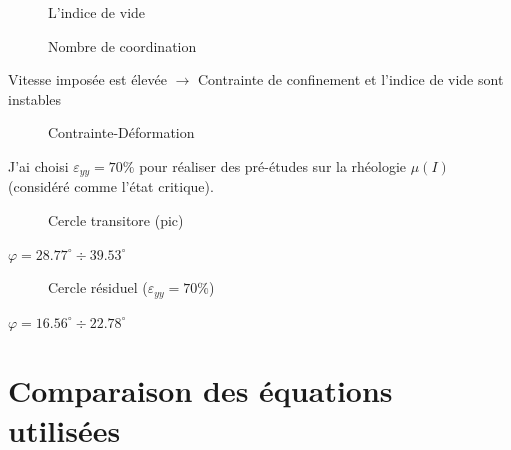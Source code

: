\documentclass[a4paper,12pt]{report}
\begin{document}
                                \begin{figure}
                                    \centering
                                  \small
                                  
                                    \caption{L'indice de vide}
                                \end{figure}
                                    
                                \begin{figure}
                                   
                                    \caption{Nombre de coordination}
                                \end{figure}

                                Vitesse imposée est élevée $\rightarrow$ Contrainte de confinement et l'indice de vide sont instables

     
                                \begin{figure}
                                    
                                    \caption{Contrainte-Déformation}
                                \end{figure}
                                J'ai choisi $\varepsilon_{yy} = 70\%$ pour réaliser des pré-études sur la rhéologie $\mu(I)$ (considéré comme l'état critique). 


                                \begin{figure}
                                  
                                    \caption{Cercle transitore (pic)}
                                \end{figure}

                                    $\varphi = 28.77^\circ \div 39.53^\circ $


                                \begin{figure}
                                    
                                    \caption{Cercle résiduel ($\varepsilon_{yy} = 70\%$)}
                                \end{figure}
                                    $\varphi = 16.56^\circ \div 22.78^\circ $
                                    
\section{Comparaison des équations utilisées}
\end{document}
